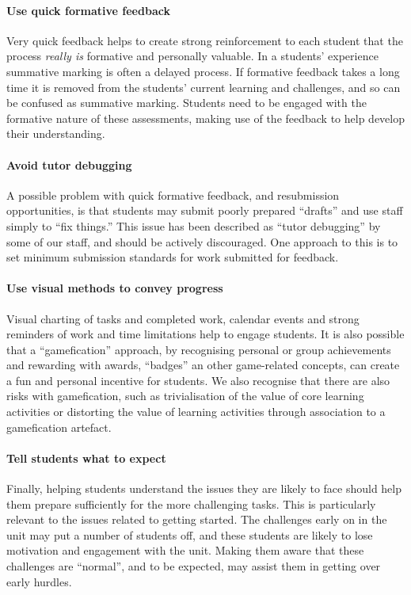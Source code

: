 \paragraph{Use quick formative feedback}

Very quick feedback helps to create strong reinforcement to each student that the process \emph{really is} formative and personally valuable. In a students' experience summative marking is often a delayed process. If formative feedback takes a long time it is removed from the students' current learning and challenges, and so can be confused as summative marking. Students need to be engaged with the formative nature of these assessments, making use of the feedback to help develop their understanding.

\paragraph{Avoid tutor debugging}

A possible problem with quick formative feedback, and resubmission opportunities, is that students may submit poorly prepared ``drafts'' and use staff simply to ``fix things.'' This issue has been described as ``tutor debugging'' by some of our staff, and should be actively discouraged. One approach to this is to set minimum submission standards for work submitted for feedback. 

\paragraph{Use visual methods to convey progress }

Visual charting of tasks and completed work, calendar events and strong reminders of work and time limitations help to engage students. It is also possible that a ``gamefication'' approach, by recognising personal or group achievements and rewarding with awards, ``badges'' an other game-related concepts, can create a fun and personal incentive for students. We also recognise that there are also risks with gamefication, such as trivialisation of the value of core learning activities or distorting the value of learning activities through association to a gamefication artefact.

\paragraph{Tell students what to expect}
Finally, helping students understand the issues they are likely to face should help them prepare sufficiently for the more challenging tasks. This is particularly relevant to the issues related to getting started. The challenges early on in the unit may put a number of students off, and these students are likely to lose motivation and engagement with the unit. Making them aware that these challenges are ``normal'', and to be expected, may assist them in getting over early hurdles.

